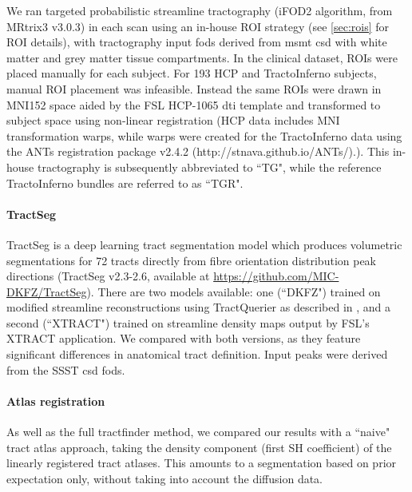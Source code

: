 We ran targeted probabilistic streamline tractography (iFOD2 algorithm\autocite{Tournier2010}, from MRtrix3\autocite{Tournier2019} v3.0.3) in each scan using an in-house ROI strategy (see \ref{sec:rois} for ROI details), with tractography input \gls{fod}s derived from \gls{msmt} \gls{csd} \autocite{Jeurissen2014} with white matter and grey matter tissue compartments.
In the clinical dataset, ROIs were placed manually for each subject.
For 193 HCP and TractoInferno subjects, manual ROI placement was infeasible.
Instead the same ROIs were drawn in MNI152 space aided by the FSL HCP-1065 \gls{dti} template\autocite{FSLATLAS} and transformed to subject space using non-linear registration (HCP data includes MNI transformation warps, while warps were created for the TractoInferno data using the ANTs registration package v2.4.2 (http://stnava.github.io/ANTs/).\autocite{Tustison2013,Avants2011}).
This in-house tractography is subsequently abbreviated to ``TG", while the reference TractoInferno bundles are referred to as ``TGR".

\paragraph*{TractSeg}

TractSeg \autocite{Wasserthal2018} is a deep learning tract segmentation model which produces volumetric segmentations for 72 tracts directly from fibre orientation distribution peak directions (TractSeg v2.3-2.6, available at \url{https://github.com/MIC-DKFZ/TractSeg}).
There are two models available: one (``DKFZ") trained on modified streamline reconstructions using TractQuerier \autocite{Wassermann2016} as described in \textcite{Wasserthal2018}, and a second (``XTRACT") trained on streamline density maps output by FSL's XTRACT application. \autocite{Warrington2020}
We compared with both versions, as they feature significant differences in anatomical tract definition.
Input peaks were derived from the SSST \gls{csd} \gls{fod}s.

\paragraph*{Atlas registration}

As well as the full tractfinder method, we compared our results with a ``naive" tract atlas approach, taking the density component (first SH coefficient) of the linearly registered tract atlases.
This amounts to a segmentation based on prior expectation only, without taking into account the diffusion data.


